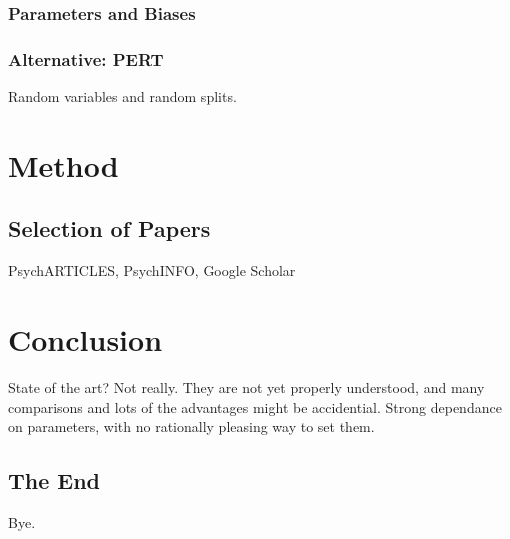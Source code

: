 \documentclass[a4paper,man,12pt,apacite]{apa6} %
\begin{document}
\subsubsection{Parameters and Biases}

\subsubsection{Alternative: PERT}
Random variables and random splits.

\section{Method}

\subsection{Selection of Papers}
PsychARTICLES, PsychINFO, Google Scholar

\section{Conclusion}
State of the art? Not really. They are not yet properly understood, and
many comparisons and lots of the advantages might be accidential.
Strong dependance on parameters, with no rationally pleasing way to set them.

\subsection{The End}
Bye.


\end{document}
